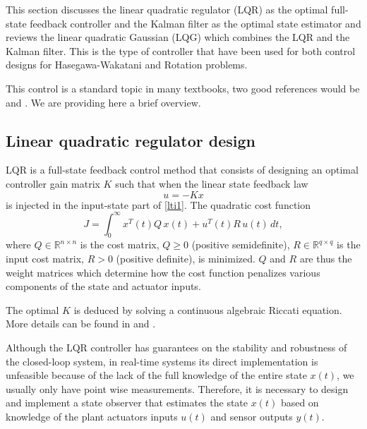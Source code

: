 \documentclass[12pt,lot, lof]{puthesis}
\begin{document}
This section discusses the linear quadratic regulator (LQR) as the optimal full-state feedback controller and the Kalman filter as the optimal state estimator and reviews the linear quadratic Gaussian (LQG) which combines the LQR and the Kalman filter. This is the type of controller that have been used for both control designs for Hasegawa-Wakatani and Rotation problems.

This control is a standard topic in many textbooks, two good references would be \cite{SandP} and \cite{AandM}. We are providing here a brief overview.

\subsection{ Linear quadratic regulator design}

LQR is a full-state feedback control method that consists of designing an optimal controller gain matrix $K$ such that when the linear state feedback law
\begin{equation}
\label{ltilqr}
u=-K x
\end{equation}
is injected in the input-state part of \eqref{lti1}. The quadratic cost function
\begin{equation}
J = \int_0^{\infty} x^T(t) Q \, x(t) + u^T(t) R \, u(t) \, dt,
\end{equation}
where $Q \in \mathbb{R}^{n \times n}$ is the cost matrix, $Q \ge 0$ (positive semidefinite), $R \in \mathbb{R}^{q \times q}$ is the input cost matrix, $R > 0$ (positive definite), is minimized.
$Q$ and $R$ are thus the weight matrices which determine how the cost function penalizes various components of the state and actuator inputs.

The optimal $K$ is deduced by solving a continuous algebraic Riccati equation. More details can be found in \cite{SandP} and \cite{AandM}.

Although the LQR controller has guarantees on the stability and robustness of the closed-loop system, in real-time systems its direct implementation is unfeasible because of the lack of the full knowledge of the entire state $x(t)$, we usually only have point wise measurements. Therefore, it is necessary to design and implement a state observer that estimates the state $x(t)$ based on knowledge of the plant actuators inputs $u(t)$ and sensor outputs $y(t)$.
\end{document}
